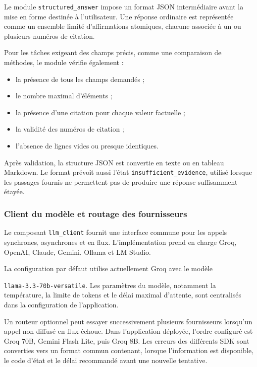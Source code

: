 Le module \texttt{structured\_answer} impose un format JSON intermédiaire avant la
mise en forme destinée à l'utilisateur. Une réponse ordinaire est représentée comme
un ensemble limité d'affirmations atomiques, chacune associée à un ou plusieurs
numéros de citation.

Pour les tâches exigeant des champs précis, comme une comparaison de méthodes, le
module vérifie également :

\begin{itemize}
  \item la présence de tous les champs demandés ;
  \item le nombre maximal d'éléments ;
  \item la présence d'une citation pour chaque valeur factuelle ;
  \item la validité des numéros de citation ;
  \item l'absence de lignes vides ou presque identiques.
\end{itemize}

Après validation, la structure JSON est convertie en texte ou en tableau Markdown.
Le format prévoit aussi l'état \texttt{insufficient\_evidence}, utilisé lorsque les
passages fournis ne permettent pas de produire une réponse suffisamment étayée.

\subsubsection{Client du modèle et routage des fournisseurs}

Le composant \texttt{llm\_client} fournit une interface commune pour les appels
synchrones, asynchrones et en flux. L'implémentation prend en charge Groq, OpenAI,
Claude, Gemini, Ollama et LM Studio.

La configuration par défaut utilise actuellement Groq avec le modèle

\texttt{llama-3.3-70b-versatile}. 
Les paramètres du modèle, notamment la température,
la limite de tokens et le délai maximal d'attente, sont centralisés dans la
configuration de l'application.

Un routeur optionnel peut essayer successivement plusieurs fournisseurs lorsqu'un
appel non diffusé en flux échoue. Dans l'application déployée, l'ordre configuré est
Groq 70B, Gemini Flash Lite, puis Groq 8B.
Les erreurs des différents SDK sont converties vers un format commun contenant, lorsque
l'information est disponible, le code d'état et le délai recommandé avant une nouvelle
tentative.

